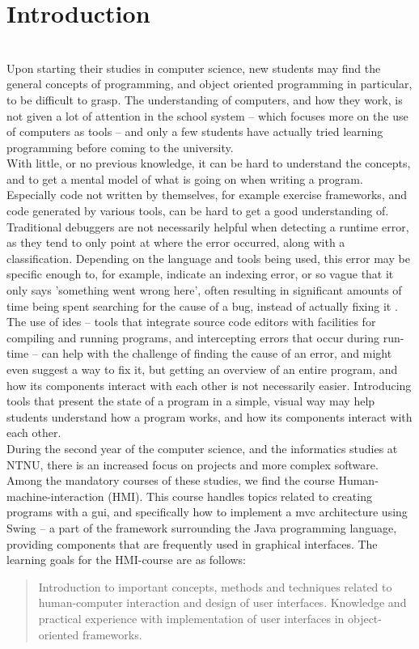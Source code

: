 \chapter{Introduction}\label{introduction}
~\\
Upon starting their studies in computer science, new students may find the general concepts of programming, and object oriented programming in particular, to be difficult to grasp.
The understanding of computers, and how they work, is not given a lot of attention in the school system -- which focuses more on the use of computers as tools -- and only a few students have actually tried learning programming before coming to the university. %
~\\

With little, or no previous knowledge, it can be hard to understand the concepts, and to get a mental model of what is going on when writing a program.
Especially code not written by themselves, for example exercise frameworks, and code generated by various tools, can be hard to get a good understanding of.
Traditional debuggers are not necessarily helpful when detecting a runtime error, as they tend to only point at where the error occurred, along with a classification.
Depending on the language and tools being used, this error may be specific enough to, for example, indicate an indexing error, or so vague that it only says 'something went wrong here', often resulting in significant amounts of time being spent searching for the cause of a bug, instead of actually fixing it \cite{ko2006}. %
The use of \glspl{ide} -- tools that integrate source code editors with facilities for compiling and running programs, and intercepting errors that occur during run-time -- can help with the challenge of finding the cause of an error, and might even suggest a way to fix it, but getting an overview of an entire program, and how its components interact with each other is not necessarily easier.
Introducing tools that present the state of a program in a simple, visual way may help students understand how a program works, and how its components interact with each other.
~\\

During the second year of the computer science, and the informatics studies at NTNU, there is an increased focus on projects and more complex software.
Among the mandatory courses of these studies, we find the course Human-machine-interaction (HMI).
This course handles topics related to creating programs with a \gls{gui}, and specifically how to implement a \gls{mvc} architecture using Swing -- a part of the framework surrounding the Java programming language, providing components that are frequently used in graphical interfaces.
The learning goals for the HMI-course are as follows:
\begin{quotation}
Introduction to important concepts, methods and techniques related to human-computer interaction and design of user interfaces.
Knowledge and practical experience with implementation of user interfaces in object-oriented frameworks.
\end{quotation}

